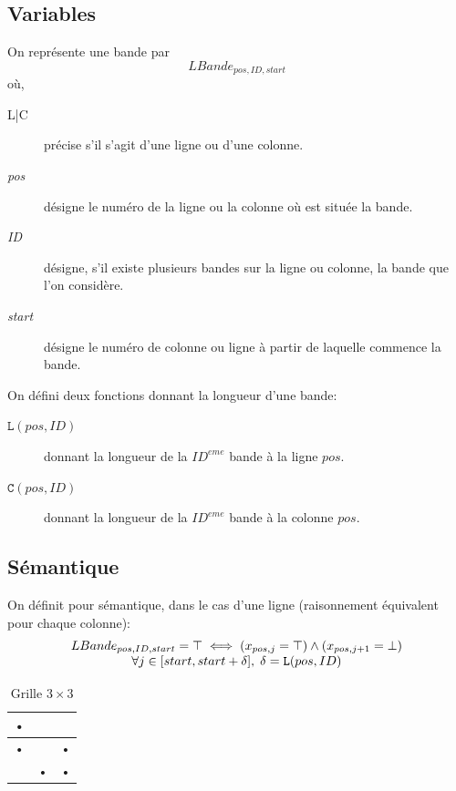 \documentclass[a4paper,12pt]{report}
\newcommand\black{\cellcolor{black}}
\begin{document}
\subsection{Variables}

On représente une bande par $$LBande_{pos,ID,start}$$
où,
\begin{description}
\item[L|C] précise s'il s'agit d'une ligne ou d'une colonne.
\item[\textit{pos}] désigne le numéro de la ligne ou la colonne où est située la bande.
\item[\textit{ID}] désigne, s'il existe plusieurs bandes sur la ligne ou colonne, la bande que l'on considère.
\item[\textit{start}] désigne le numéro de colonne ou ligne à partir de laquelle commence la bande.\\
\end{description}

On défini deux fonctions donnant la longueur d'une bande:
\begin{description}
\item[$\mathtt{L}(pos,ID)$] donnant la longueur de la $ID^{eme}$ bande à la ligne $pos$.
\item[$\mathtt{C}(pos,ID)$] donnant la longueur de la $ID^{eme}$ bande à la colonne $pos$.\\
\end{description} 

\subsection{Sémantique}
On définit pour sémantique, dans le cas d'une ligne (raisonnement équivalent pour chaque colonne):
\begin{equation}
\begin{array}[b]{c}
      LBande_{pos,ID,start} = \top \iff (x_{pos,j}=\top)\wedge (x_{pos,j+1}=\bot)\\
	\forall j \in [start,start+\delta],\;\delta = \mathtt{L}(pos,ID)      
\end{array}
\end{equation}

\begin{table}[H]
   \centering
	\begin{tabular}{|c|c|c|}
	\hline 
	\black• &  &  \\ 
	\hline 
	\black• &  & \black• \\ 
	\hline 
	 & \black• & \black• \\ 
	\hline 
	\end{tabular}
\caption{\label{Grille3X3} Grille $3\times3$}
\end{table}
\end{document}
